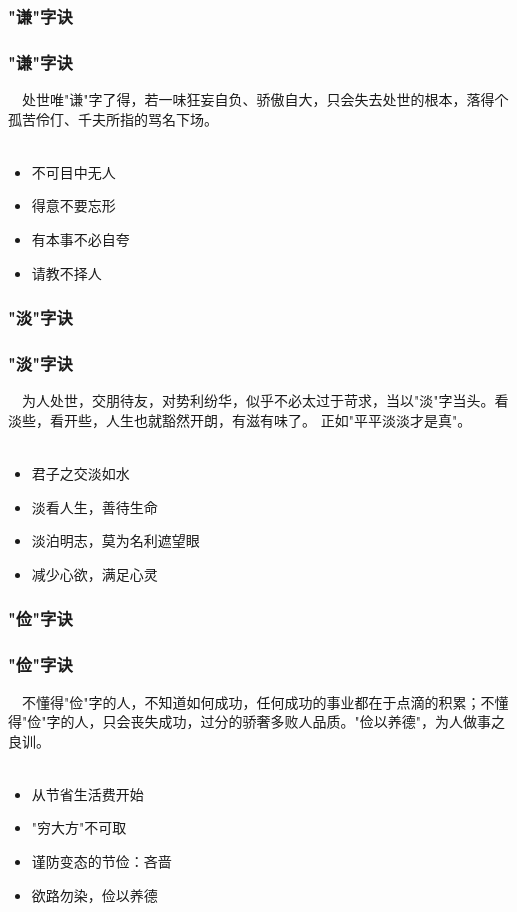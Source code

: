 \subsubsection{"谦"字诀}
\begin{frame}
\frametitle{"谦"字诀}
\noindent\handr~~处世唯"谦"字了得，若一味狂妄自负、骄傲自大，只会失去处世的根本，落得个孤苦伶仃、千夫所指的骂名下场。
~\\
~\\
\begin{itemize}
    \item 不可目中无人
    \item 得意不要忘形
    \item 有本事不必自夸
    \item 请教不择人
\end{itemize}
\end{frame}

\subsubsection{"淡"字诀}
\begin{frame}
\frametitle{"淡"字诀}
\noindent\handr~~为人处世，交朋待友，对势利纷华，似乎不必太过于苛求，当以"淡"字当头。看淡些，看开些，人生也就豁然开朗，有滋有味了。 正如"平平淡淡才是真"。
~\\
~\\
\begin{itemize}
    \item 君子之交淡如水
    \item 淡看人生，善待生命
    \item 淡泊明志，莫为名利遮望眼
    \item 减少心欲，满足心灵
\end{itemize}
\end{frame}

\subsubsection{"俭"字诀}
\begin{frame}
\frametitle{"俭"字诀}
\noindent\handr~~不懂得"俭"字的人，不知道如何成功，任何成功的事业都在于点滴的积累；不懂得"俭"字的人，只会丧失成功，过分的骄奢多败人品质。"俭以养德"，为人做事之良训。
~\\
~\\
\begin{itemize}
    \item 从节省生活费开始
    \item "穷大方"不可取
    \item 谨防变态的节俭：吝啬
    \item 欲路勿染，俭以养德
\end{itemize}
\end{frame}

